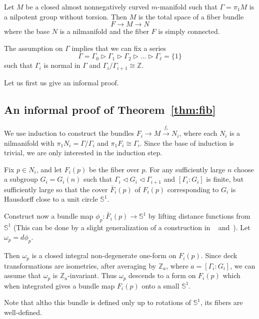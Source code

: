 \documentclass{amsart}
\begin{document}
\begin{thm}\label{thm:fib}

Let $M$ be a closed almost nonnegatively curved $m$-manifold
such that $\Gamma=\pi_1M$ is a nilpotent group without torsion.
Then  $M$
is the total space of a fiber bundle
$$
 F\to M\to N
$$
where the base $N$ is a nilmanifold and the fiber $F$ is simply connected.
\end{thm}

The assumption on $\Gamma$ implies that
we can fix a series
$$\Gamma=\Gamma_0\rhd\Gamma_1\rhd\Gamma_2\rhd\ldots\rhd\Gamma_\ell=\{1\}$$
such that $\Gamma_i$ is normal in $\Gamma$ and $\Gamma_i/\Gamma_{i+1}\cong \mathbb{Z}$.

Let us first us give an informal proof.

\subsection{An informal proof of Theorem~\ref{thm:fib}}
We use induction to construct the bundles
$F_i\longrightarrow M\overset{f_i}{\longrightarrow} N_i$, where each $N_i$ is a
nilmanifold with $\pi_1N_i=\Gamma/\Gamma_i$
and $\pi_1F_i\cong \Gamma_i$.
Since the base of induction is trivial,
we are only interested in the induction step.

Fix $p\in N_i$,
and let $F_i(p)$ be the fiber over $p$.
For any sufficiently large $n$
choose a subgroup $G_i=G_i(n)$
such that $\Gamma_{i}\lhd G_i\lhd \Gamma_{i+1}$ and
$[\Gamma_i: G_i]$ is finite,
but sufficiently large so that the cover
$\bar{F}_i(p)$ of $F_i(p)$
corresponding to $G_i$ is Hausdorff close to a unit circle $\mathbb{S}^{1}$.


Construct now a bundle map $\phi_p\colon \bar F_i(p)\to \mathbb{S}^{1}$
by lifting distance functions from $\mathbb{S}^{1}$
(This can be done by a slight generalization
of a construction in ~\cite{FY}  and~\cite{BGP}).
Let $\omega_p=d\phi_p$.

Then $\omega_p$
is a closed integral non-degenerate one-form on $F_i(p)$.
Since deck transformations are isometries,
after  averaging by $\mathbb{Z}_a$, where $a= [\Gamma_i: G_i]$,
we can assume that
$\omega_p$ is $\mathbb{Z}_a$-invariant.
Thus $\omega_p$ descends to a form on $F_i(p)$
which when integrated gives a bundle map $F_i(p)$ onto a small $\mathbb{S}^{1}$.

Note that altho this bundle is defined only up to rotations of $\mathbb{S}^{1}$,
its fibers are well-defined.
\end{document}
